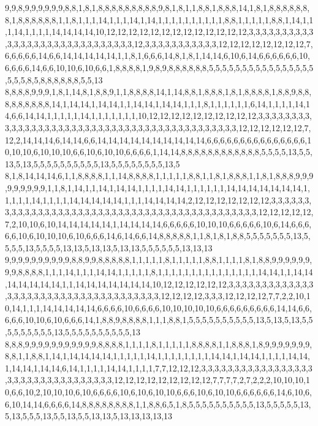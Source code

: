 9,9,8,9,9,9,9,9,9,8,8,1,8,1,8,8,8,8,8,8,8,8,8,9,8,1,8,1,1,8,8,1,8,8,8,14,1,8,1,8,8,8,8,8,8,8,1,8,8,8,8,8,8,1,1,8,1,1,1,14,1,1,1,14,1,14,1,1,1,1,1,1,1,1,1,1,8,8,1,1,1,1,1,8,8,1,14,1,1,1,14,1,1,1,1,14,14,14,14,10,12,12,12,12,12,12,12,12,12,12,12,12,12,3,3,3,3,3,3,3,3,3,3,3,3,3,3,3,3,3,3,3,3,3,3,3,3,3,3,3,3,3,12,3,3,3,3,3,3,3,3,3,3,3,12,12,12,12,12,12,12,12,7,6,6,6,6,6,14,6,6,14,14,14,14,14,1,1,8,1,6,6,6,14,8,1,8,1,14,14,6,10,6,14,6,6,6,6,6,6,10,6,6,6,6,14,6,6,10,10,6,10,6,6,1,8,8,8,8,1,9,8,9,8,8,8,8,8,8,5,5,5,5,5,5,5,5,5,5,5,5,5,5,5,5,5,5,5,8,5,8,8,8,8,8,8,5,5,13
8,8,8,8,9,9,9,1,8,1,14,8,1,8,8,9,1,1,8,8,8,8,14,1,14,8,8,1,8,8,8,1,8,1,8,8,8,8,1,8,8,9,8,8,8,8,8,8,8,8,8,14,1,14,14,1,14,14,1,1,14,14,1,14,14,1,1,1,8,1,1,1,1,1,1,6,14,1,1,1,1,14,14,6,6,14,14,1,1,1,1,1,14,1,1,1,1,1,1,1,10,12,12,12,12,12,12,12,12,12,12,3,3,3,3,3,3,3,3,3,3,3,3,3,3,3,3,3,3,3,3,3,3,3,3,3,3,3,3,3,3,3,3,3,3,3,3,3,3,3,3,3,3,3,12,12,12,12,12,12,7,12,2,14,14,14,6,14,14,6,6,14,14,14,14,14,14,14,14,14,14,6,6,6,6,6,6,6,6,6,6,6,6,6,6,6,10,10,10,6,10,10,10,6,6,10,6,10,10,6,6,6,6,1,14,14,8,8,8,8,8,8,8,8,8,8,8,8,5,5,5,5,13,5,5,13,5,13,5,5,5,5,5,5,5,5,5,5,13,5,5,5,5,5,5,5,5,13,5
8,1,8,14,14,14,6,1,1,8,8,8,8,1,1,14,8,8,8,8,1,1,1,1,1,8,8,1,1,8,1,8,8,8,1,1,8,1,8,8,8,9,9,9,9,9,9,9,9,9,1,1,8,1,14,1,1,14,1,14,14,1,1,1,1,14,14,1,1,1,1,1,1,14,14,14,14,14,14,14,1,1,1,1,1,14,1,1,1,1,14,14,14,14,14,1,1,1,14,14,14,14,2,12,12,12,12,12,12,12,3,3,3,3,3,3,3,3,3,3,3,3,3,3,3,3,3,3,3,3,3,3,3,3,3,3,3,3,3,3,3,3,3,3,3,3,3,3,3,3,3,3,3,3,12,12,12,12,12,7,2,10,10,6,10,14,14,14,14,14,1,14,14,14,14,6,6,6,6,6,10,10,10,6,6,6,6,6,10,6,14,6,6,6,6,6,10,6,10,10,10,6,10,6,6,6,14,6,14,6,6,14,8,8,8,8,8,1,1,8,1,8,1,8,8,5,5,5,5,5,5,5,13,5,5,5,5,13,5,5,5,5,13,13,5,13,13,5,13,13,5,5,5,5,5,5,13,13,13
9,9,9,9,9,9,9,9,9,9,8,8,9,9,8,8,8,8,8,1,1,1,1,1,8,1,1,1,1,1,8,8,1,1,1,1,8,1,8,8,9,9,9,9,9,9,9,9,8,8,8,8,1,1,1,14,1,1,1,14,14,1,1,1,1,1,8,1,1,1,1,1,1,1,1,1,1,1,1,1,1,1,14,14,1,1,14,14,14,14,14,14,14,1,1,14,14,14,14,14,14,14,10,12,12,12,12,12,12,3,3,3,3,3,3,3,3,3,3,3,3,3,3,3,3,3,3,3,3,3,3,3,3,3,3,3,3,3,3,3,3,3,3,3,3,12,12,12,12,3,3,3,12,12,12,12,7,7,2,2,10,10,14,1,1,1,14,14,14,14,14,6,6,6,6,10,6,6,6,6,10,10,10,10,10,6,6,6,6,6,6,6,6,6,14,14,6,6,6,6,6,10,10,6,10,6,6,6,14,1,8,8,9,8,8,8,8,1,1,1,8,8,1,5,5,5,5,5,5,5,5,5,5,13,5,13,5,13,5,5,5,5,5,5,5,5,5,13,5,5,5,5,5,5,5,5,5,5,13
8,8,8,9,9,9,9,9,9,9,9,9,9,9,8,8,8,8,1,1,1,1,8,1,1,1,1,1,8,8,8,8,1,1,8,8,8,1,8,9,9,9,9,9,9,9,8,8,1,1,8,8,1,14,1,14,14,14,14,1,1,1,1,1,14,1,1,1,1,1,1,1,1,14,14,1,14,14,1,1,1,1,14,14,1,14,14,1,14,14,6,14,1,1,1,1,14,14,1,1,1,1,7,7,12,12,12,3,3,3,3,3,3,3,3,3,3,3,3,3,3,3,3,3,3,3,3,3,3,3,3,3,3,3,3,3,3,3,3,3,12,12,12,12,12,12,12,12,12,7,7,7,7,2,7,2,2,2,10,10,10,10,6,6,10,2,10,10,10,6,10,6,6,6,6,10,6,10,6,10,10,6,6,6,10,6,10,10,6,6,6,6,6,6,14,6,10,6,6,10,14,14,6,6,6,6,14,8,8,8,8,8,8,8,8,1,1,8,8,6,5,1,8,5,5,5,5,5,5,5,5,5,5,13,5,5,5,5,5,13,5,13,5,5,5,13,5,5,13,5,5,13,13,5,13,13,13,13,13
